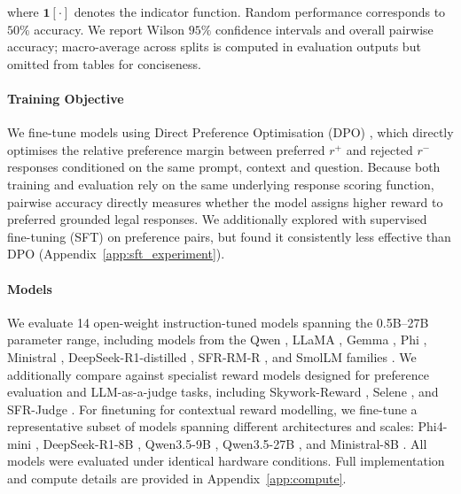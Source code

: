 \documentclass{article}
\theoremstyle{plain}
\theoremstyle{definition}
\theoremstyle{remark}
\begin{document}
where $\mathbf{1}[\cdot]$ denotes the indicator function. Random performance corresponds to $50\%$ accuracy. We report Wilson $95\%$ confidence intervals and overall pairwise accuracy; macro-average across splits is computed in evaluation outputs but omitted from tables for conciseness.



\paragraph{Training Objective}

We fine-tune models using Direct Preference Optimisation (DPO) \citep{rafailov2023direct}, which directly optimises the relative preference margin between preferred $r^{+}$ and rejected $r^{-}$ responses conditioned on the same prompt, context and question. Because both training and evaluation rely on the same underlying response scoring function, pairwise accuracy directly measures whether the model assigns higher reward to preferred grounded legal responses. We additionally explored with supervised fine-tuning (SFT) on preference pairs, but found it consistently less effective than DPO (Appendix~\ref{app:sft_experiment}).


\paragraph{Models}

We evaluate 14 open-weight instruction-tuned models spanning the 0.5B--27B parameter range, including models from the Qwen \citep{qwen_qwen25_2025,qwen35}, LLaMA \citep{llama32}, Gemma \citep{team_gemma_2024, team_gemma_2025}, Phi \citep{abdin_phi-3_2024, microsoft_phi-4-mini_2025}, Ministral \citep{liu_ministral_2026}, DeepSeek-R1-distilled \citep{deepseek-ai_deepseek-r1_2025}, SFR-RM-R \citep{dong2024rlhf}, and SmolLM families \citep{allal_smollm2_2025}. We additionally compare against specialist reward models designed for preference evaluation and LLM-as-a-judge tasks, including Skywork-Reward \citep{liu2024skywork}, Selene \citep{alexandru_atla_2025}, and SFR-Judge \citep{wang_direct_2024}. 
For finetuning for contextual reward modelling, we fine-tune a representative subset of models spanning different architectures and scales: Phi4-mini \citep{microsoft_phi-4-mini_2025}, DeepSeek-R1-8B \citep{deepseek-ai_deepseek-r1_2025}, Qwen3.5-9B \citep{qwen35}, Qwen3.5-27B \citep{qwen35}, and Ministral-8B \citep{liu_ministral_2026}. All models were evaluated under identical hardware conditions. Full implementation and compute details are provided in Appendix~\ref{app:compute}.
\end{document}
